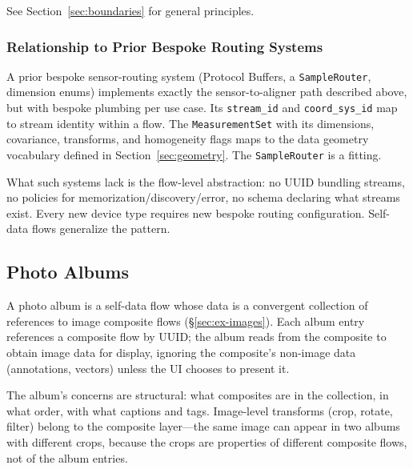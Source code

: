 \documentclass[11pt, letterpaper]{article}
\begin{document}
See Section~\ref{sec:boundaries} for general principles.

\subsubsection{Relationship to Prior Bespoke Routing Systems}

A prior bespoke sensor-routing system (Protocol Buffers, a \texttt{SampleRouter},
dimension enums) implements exactly the sensor-to-aligner path described above, but
with bespoke plumbing per use case. Its \texttt{stream\_id} and \texttt{coord\_sys\_id}
map to stream identity within a flow. The \texttt{MeasurementSet} with its dimensions,
covariance, transforms, and homogeneity flags maps to the data geometry vocabulary
defined in Section~\ref{sec:geometry}. The \texttt{SampleRouter} is a fitting.

What such systems lack is the flow-level abstraction: no UUID bundling streams, no
policies for memorization/discovery/error, no schema declaring what streams exist.
Every new device type requires new bespoke routing configuration. Self-data flows
generalize the pattern.

\subsection{Photo Albums}
\label{sec:ex-albums}

A photo album is a self-data flow whose data is a convergent collection of references
to image composite flows (\S\ref{sec:ex-images}). Each album entry references a
composite flow by UUID; the album reads from the composite to obtain image data for
display, ignoring the composite's non-image data (annotations, vectors) unless the
UI chooses to present it.

The album's concerns are structural: what composites are in the collection, in what
order, with what captions and tags. Image-level transforms (crop, rotate, filter)
belong to the composite layer---the same image can appear in two albums with different
crops, because the crops are properties of different composite flows, not of the album
entries.
\end{document}

